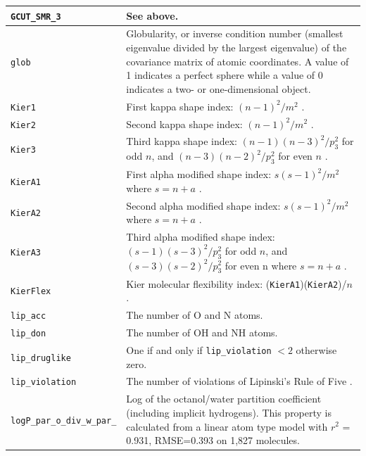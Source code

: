\documentclass[12pt,a4paper]{article}
\begin{document}
\begin{longtable}{@{\zz}|p{}|p{}|}
\texttt{GCUT\_SMR\_3} & See above.\\ \hline

\texttt{glob} & Globularity, or inverse condition number (smallest 
eigenvalue divided by the largest eigenvalue) of the covariance matrix 
of atomic coordinates. A value of 1 indicates a perfect sphere while a 
value of 0 indicates a two- or one-dimensional object.\\ \hline

\texttt{Kier1} & First kappa shape index: $(n-1)^2 / m^2$ \cite{Hall1991}.\\ 
\hline

\texttt{Kier2} & Second kappa shape index: $(n-1)^2 / m^2$ \cite{Hall1991}.\\ 
\hline

\texttt{Kier3} & Third kappa shape index: $(n-1)(n-3)^2 / p_3^2$ for odd $n$, 
and $(n-3)(n-2)^2 / p_3^2$ for even $n$ \cite{Hall1991}.\\ \hline

\texttt{KierA1} & First alpha modified shape index: $s(s-1)^2 / m^2$ where 
$s = n + a$ \cite{Hall1991}.\\ \hline

\texttt{KierA2} & Second alpha modified shape index: $s(s-1)^2 / m^2$ where 
$s = n + a$ \cite{Hall1991}.\\ \hline

\texttt{KierA3} & Third alpha modified shape index: $(s-1)(s-3)^2 / p_3^2$ 
for odd $n$, and $(s-3)(s-2)^2 / p_3^2$ for even n where $s = n + a$ 
\cite{Hall1991}.\\ \hline

\texttt{KierFlex} & Kier molecular flexibility index: 
(\texttt{KierA1})(\texttt{KierA2})/$n$ \cite{Hall1991}.\\ \hline

\texttt{lip\_acc} & The number of O and N atoms.\\ \hline

\texttt{lip\_don} & The number of OH and NH atoms.\\ \hline

\texttt{lip\_druglike} & One if and only if \texttt{lip\_violation} $< 2$ 
otherwise zero.\\ \hline

\texttt{lip\_violation} & The number of violations of Lipinski's Rule of Five 
\cite{Lipinski2012}.\\ \hline

\texttt{logP\_par\_o\_div\_w\_par\_} & Log of the octanol/water partition 
coefficient (including implicit hydrogens). This property is calculated from a 
linear atom type model \cite{LOGP1998} with $r^2$ = 0.931, RMSE=0.393 on 
1,827 molecules.\\ \hline


\end{longtable}
\end{document}
